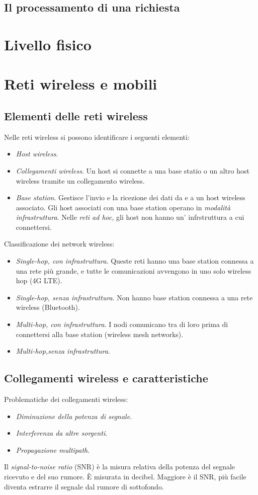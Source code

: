 \documentclass[11pt]{book}
\begin{document}
\section{Il processamento di una richiesta}

\chapter{Livello fisico}

\chapter{Reti wireless e mobili}
\section{Elementi delle reti wireless}
Nelle reti wireless si possono identificare i seguenti elementi:
\begin{itemize}
    \item \textit{Host wireless}. 
    \item \textit{Collegamenti wireless}. Un host si connette a una base statio o un altro host wireless tramite un collegamento 
    wireless.
    \item \textit{Base station}. Gestisce l'invio e la ricezione dei dati da e a un host wireless associato. Gli host associati 
    con una base station operano in \textit{modalità infrastruttura}. Nelle \textit{reti ad hoc}, gli host non hanno un'
    infrstruttura a cui connettersi.
\end{itemize}
Classificazione dei network wireless:
\begin{itemize}
    \item \textit{Single-hop, con infrastruttura}. Queste reti hanno una base station connessa a una rete più grande, e 
    tutte le comunicazioni avvengono in uno solo wireless hop (4G LTE).
    \item \textit{Single-hop, senza infrastruttura}. Non hanno base station connessa a una rete wireless (Bluetooth).
    \item \textit{Multi-hop, con infrastruttura}. I nodi comunicano tra di loro prima di connettersi alla base station 
    (wireless mesh networks).
    \item \textit{Multi-hop,senza infrastruttura}. 
\end{itemize}
\section{Collegamenti wireless e caratteristiche}
Problematiche dei collegamenti wireless:
\begin{itemize}
    \item \textit{Diminuzione della potenza di segnale}.
    \item \textit{Interferenza da altre sorgenti}.
    \item \textit{Propagazione multipath}.
\end{itemize}
Il \textit{signal-to-noise ratio} (SNR) è la misura relativa della potenza del segnale ricevuto e del suo rumore. È misurata 
in decibel. Maggiore è il SNR, più facile diventa estrarre il segnale dal rumore di sottofondo.
\end{document}
